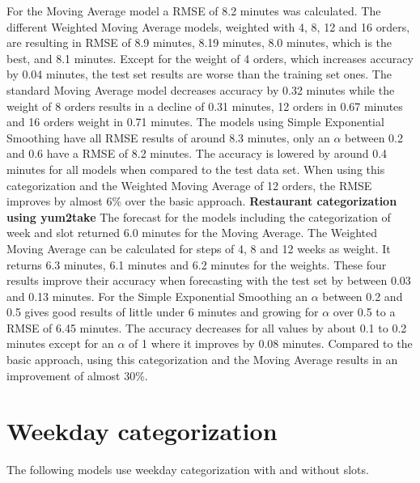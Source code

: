 For the Moving Average model a RMSE of 8.2 minutes was calculated. The different Weighted Moving Average models, weighted with 4, 8, 12 and 16 orders, are resulting in RMSE of 8.9 minutes, 8.19 minutes, 8.0 minutes, which is the best, and 8.1 minutes. Except for the weight of 4 orders, which increases accuracy by 0.04 minutes, the test set results are worse than the training set ones. The standard Moving Average model decreases accuracy by 0.32 minutes while the weight of 8 orders results in a decline of 0.31 minutes, 12 orders in 0.67 minutes and 16 orders weight in 0.71 minutes. The models using Simple Exponential Smoothing have all RMSE results of around 8.3 minutes, only an $\alpha$ between 0.2 and 0.6 have a RMSE of 8.2 minutes. The accuracy is lowered by around 0.4 minutes for all models when compared to the test data set.\newline
When using this categorization and the Weighted Moving Average of 12 orders, the RMSE improves by almost 6\% over the basic approach.
\newline\newline\textbf{Restaurant categorization using yum2take}\newline
The forecast for the models including the categorization of week and slot returned 6.0 minutes for the Moving Average. The Weighted Moving Average can be calculated for steps of 4, 8 and 12 weeks as weight. It returns 6.3 minutes, 6.1 minutes and 6.2 minutes for the weights. These four results improve their accuracy when forecasting with the test set by between 0.03 and 0.13 minutes. For the Simple Exponential Smoothing an $\alpha$ between 0.2 and 0.5 gives good results of little under 6 minutes and growing for $\alpha$ over 0.5 to a RMSE of 6.45 minutes. The accuracy decreases for all values by about 0.1 to 0.2 minutes except for an $\alpha$ of 1 where it improves by 0.08 minutes.\newline
Compared to the basic approach, using this categorization and the Moving Average results in an improvement of almost 30\%.
\section{Weekday categorization}\label{section:Weekday categorization}
The following models use weekday categorization with and without slots.
